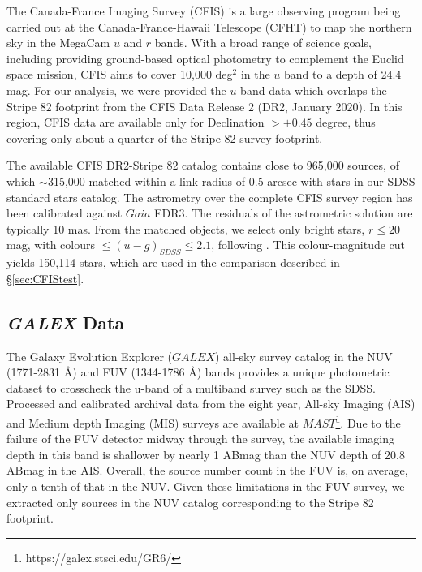 \documentclass[fleqn,usenatbib]{mnras}
\begin{document}
The Canada-France Imaging Survey (CFIS) \citep{2017ApJ...848..128I} is a large observing program being carried out at the Canada-France-Hawaii Telescope (CFHT) to map the northern sky in the MegaCam $u$ and $r$ bands. With a broad range of science goals, including providing ground-based optical photometry to complement the Euclid space mission, CFIS aims to cover 10,000 deg$^2$ in the $u$ band to a depth of 24.4 mag. For our analysis, we were provided the $u$ band data which 
overlaps the Stripe 82 footprint from the CFIS Data Release 2 (DR2, January 2020). In this region, CFIS data are available
only for Declination $>+0.45$ degree, thus covering only about a quarter of the Stripe 82 survey footprint. 

The available CFIS DR2-Stripe 82 catalog contains close to 965,000 sources, of which $\sim$315,000 matched within 
a link radius of 0.5 arcsec with stars in our SDSS standard stars catalog. The astrometry over the complete CFIS survey 
region has been calibrated against $Gaia$ EDR3.  The residuals of the astrometric solution are typically 10 mas.  From the matched objects, we select only bright stars, $r \leq 20$ mag,  with colours  $\leq (u-g)_{SDSS} \leq 2.1$, following \cite{2017ApJ...848..128I}. This colour-magnitude cut yields 150,114 stars, which are used in the comparison described in \S \ref{sec:CFIStest}.  %



\subsection{{\it GALEX} Data} \label{ssec:galex}

The Galaxy Evolution Explorer ($GALEX$) all-sky survey catalog in the NUV (1771-2831 \AA) and FUV (1344-1786 \AA) bands provides a unique photometric dataset to crosscheck the u-band of a multiband survey such as the SDSS. Processed and calibrated archival data from the eight year, All-sky Imaging (AIS) and Medium depth Imaging (MIS) surveys are available at $MAST$\footnote{https://galex.stsci.edu/GR6/}. Due to the failure of the FUV detector midway through the survey, the available imaging depth in this band is shallower by nearly 1 ABmag than the NUV depth of 20.8 ABmag in the AIS. Overall, the source number count in the FUV is, on average, only a tenth of that in the NUV. Given these limitations in the FUV survey, we extracted only sources in the NUV catalog corresponding to the Stripe 82 footprint.  
 
\end{document}
